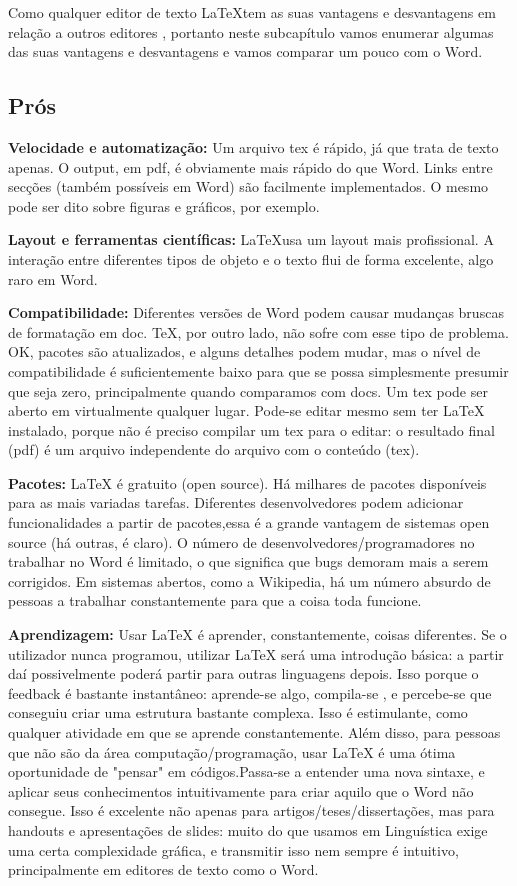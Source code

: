 Como qualquer editor de texto \LaTeX tem as suas vantagens e desvantagens em relação a outros editores , portanto neste subcapítulo vamos enumerar algumas das suas vantagens e desvantagens e vamos comparar um pouco com o Word.

\subsection{Prós}
\textbf{Velocidade e automatização:} Um arquivo tex é rápido, já que trata de texto apenas. O output, em pdf, é obviamente mais rápido do que Word. Links entre secções (também possíveis em Word) são facilmente implementados. O mesmo pode ser dito sobre figuras e gráficos, por exemplo.

\textbf{Layout e ferramentas científicas:} \LaTeX usa um layout mais profissional. A interação entre diferentes tipos de objeto e o texto flui de forma excelente, algo raro em Word.

\textbf{Compatibilidade:} Diferentes versões de Word podem causar mudanças bruscas de formatação em doc. TeX, por outro lado, não sofre com esse tipo de problema. OK, pacotes são atualizados, e alguns detalhes podem mudar, mas o nível de compatibilidade é suficientemente baixo para que se possa simplesmente presumir que seja zero, principalmente quando comparamos com docs. Um tex pode ser aberto em virtualmente qualquer lugar. Pode-se editar mesmo sem ter LaTeX instalado, porque não é preciso compilar um tex para o editar: o resultado final (pdf) é um arquivo independente do arquivo com o conteúdo (tex).

\textbf{Pacotes:} LaTeX é gratuito (open source). Há milhares de pacotes disponíveis para as mais variadas tarefas. Diferentes desenvolvedores podem adicionar funcionalidades a partir de pacotes,essa é a grande vantagem de sistemas open source (há outras, é claro). O número de desenvolvedores/programadores no trabalhar no Word é limitado, o que significa que bugs demoram mais a serem corrigidos. Em sistemas abertos, como a Wikipedia, há um número absurdo de pessoas a trabalhar constantemente para que a coisa toda funcione.

\textbf{Aprendizagem:} Usar LaTeX é aprender, constantemente, coisas diferentes. Se o utilizador nunca programou, utilizar LaTeX será uma introdução básica: a partir daí possivelmente poderá partir para outras linguagens depois. Isso porque o feedback é bastante instantâneo: aprende-se algo, compila-se , e percebe-se que conseguiu criar uma estrutura bastante complexa. Isso é estimulante, como qualquer atividade em que se aprende constantemente. Além disso, para pessoas que não são da área  computação/programação, usar LaTeX é uma ótima oportunidade de "pensar" em códigos.Passa-se a entender uma nova sintaxe, e aplicar seus conhecimentos intuitivamente para criar aquilo que o Word não consegue. Isso é excelente não apenas para artigos/teses/dissertações, mas para handouts e apresentações de slides: muito do que usamos em Linguística exige uma certa complexidade gráfica, e transmitir isso nem sempre é intuitivo, principalmente em editores de texto como o Word.

